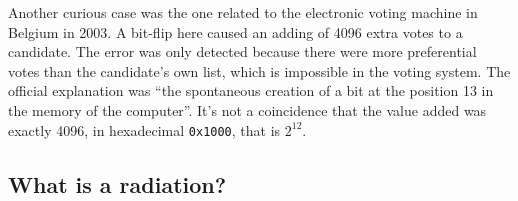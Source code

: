 Another curious case was the one related to the electronic voting machine in Belgium in 2003. A bit-flip here caused an adding of 4096 extra votes to a candidate. The error was only detected because there were more preferential votes than the candidate's own list, which is impossible in the voting system. The official explanation was ``the spontaneous creation of a bit at the position 13 in the memory of the computer''. It's not a coincidence that the value added was exactly 4096, in hexadecimal \texttt{0x1000}, that is $2^{12}$.

\subsection{What is a radiation?}
